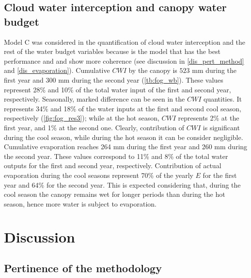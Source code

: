 \documentclass[a4paper,12pt]{article}
\begin{document}
\begin{linenumbers}
\subsection{Cloud water interception and canopy water budget}
Model C was considered in the quantification of cloud water interception and the rest of the water budget variables because is the model that has the best performance and and show more coherence (see discussion in \autoref{dis_pert_method} and \autoref{dis_evaporation}). Cumulative $CWI$ by the canopy is $523$ $\mathrm{{mm}}$ during the first year and $300$ $\mathrm{{mm}}$ during the second year (\autoref{tb:fog_wb}). These values represent 28\% and 10\% of the total water input of the first and second year, respectively. Seasonally, marked difference can be seen in the $CWI$ quantities. It represents 34\% and 18\% of the water inputs at the first and second cool season, respectively (\autoref{fig:fog_res3}); while at the hot season, $CWI$ represents 2\% at the first year, and 1\% at the second one. Clearly, contribution of $CWI$ is significant during the cool season, while during the hot season it can be consider negligible. Cumulative evaporation reaches 264 mm during the first year and 260 mm during the second year. These values correspond to 11\% and 8\% of the total water outputs for the first and second year, respectively. Contribution of actual evaporation during the cool seasons represent 70\%  of the yearly $E$ for the first year and 64\% for the second year. This is expected considering that, during the cool season the canopy remains wet for longer periods than during the hot season, hence more water is subject to evaporation.



\section{Discussion}

\subsection{Pertinence of the methodology} \label{dis_pert_method}


\end{linenumbers}
\end{document}

